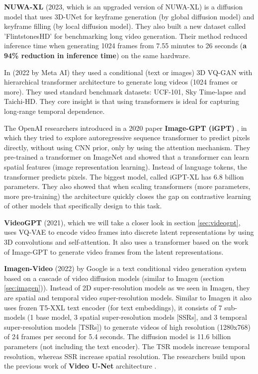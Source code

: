 \textbf{NUWA-XL} \cite{nuwa_xl} (2023, which is an upgraded version of NUWA-XL) is a diffusion model that uses 3D-UNet for keyframe generation (by global diffusion model) and keyframe filling (by local diffusion model). They also built a new dataset called 'FlintstonesHD' for benchmarking long video generation. Their method reduced inference time when generating 1024 frames from 7.55 minutes to 26 seconds (\textbf{a 94\% reduction in inference time}) on the same hardware.

In \cite{ge2022long} (2022 by Meta AI) they used a conditional (text or images) 3D VQ-GAN with hierarchical transformer architecture to generate long videos (1024 frames or more). They used standard benchmark datasets: UCF-101, Sky Time-lapse and Taichi-HD. They core insight is that using transformers is ideal for capturing long-range temporal dependence.

The OpenAI researchers introduced in a 2020 paper \textbf{Image-GPT (iGPT)} \cite{imagegpt}, in which they tried to explore autoregressive sequence transformer to predict pixels directly, without using CNN prior, only by using the attention mechanism. They pre-trained a transformer on ImageNet and showed that a transformer can learn spatial features (image representation learning). Instead of language tokens, the transformer predicts pixels. The biggest model, called iGPT-XL has 6.8 billion parameters. They also showed that when scaling transformers (more parameters, more pre-training) the architecture quickly closes the gap on contrastive learning of other models that specifically design to this task.

\textbf{VideoGPT} \cite{videogpt} (2021), which we will take a closer look in section \ref{sec:videogpt}, uses VQ-VAE to encode video frames into discrete latent representations by using 3D convolutions and self-attention. It also uses a transformer based on the work of Image-GPT to generate video frames from the latent representations.

\textbf{Imagen-Video} \cite{imagen_video} (2022) by Google is a text conditional video generation system based on a cascade of video diffusion models (similar to Imagen (section \ref{sec:imagen})). Instead of 2D super-resolution models as we seen in Imagen, they are spatial and temporal video super-resolution models. Similar to Imagen it also uses frozen T5-XXL \cite{t5_model} text encoder (for text embeddings), it consists of 7 sub-models (1 base model, 3 spatial super-resolution models [SSRs], and 3 temporal super-resolution models [TSRs]) to generate videos of high resolution (1280x768) of 24 frames per second for 5.4 seconds. The diffusion model is 11.6 billion parameters (not including the text encoder). The TSR models increase temporal resolution, whereas SSR increase spatial resolution. The researchers build upon the previous work of \textbf{Video U-Net} architecture \cite{video_diffusion_models}.

